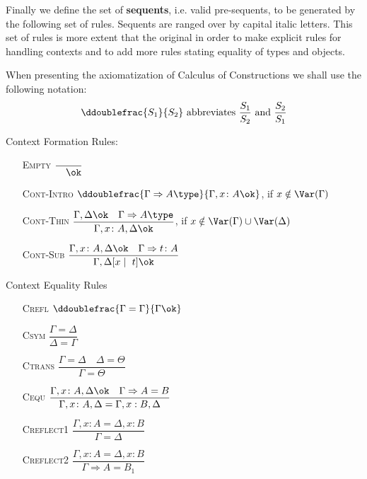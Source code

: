Finally we define the set of \textbf{sequents}, i.e. valid pre-sequents, 
to be generated by the following set of rules. 
Sequents are ranged over by capital italic letters.
This set of rules is more extent that the original in order to make explicit rules for 
handling contexts and to add more rules stating equality of types and objects.

When presenting the axiomatization of Calculus of Constructions we shall use the following notation:
\[
    \ddoublefrac{S_1}{S_2} \text{ abbreviates } \dfrac{S_1}{S_2} \text{ and } \dfrac{S_2}{S_1}
\]

Context Formation Rules:
\begin{enumerate} %
    \item[\textsc{Empty}] $\dfrac{}{\quad \ok}$
    \item[\textsc{Cont-Intro}] $\ddoublefrac{\Gamma \Rightarrow A \type}{\Gamma, x \colon A \ok}$, if $x \notin \Var(\Gamma)$
    \item[\textsc{Cont-Thin}] $\dfrac{
            \Gamma, \Delta \ok \quad \Gamma \Rightarrow A \type
        }{
            \Gamma, x \colon A, \Delta \ok
        }$, if $x \notin \Var(\Gamma) \cup \Var(\Delta)$
    \item[\textsc{Cont-Sub}] $\dfrac{
        \Gamma, x \colon A, \Delta \ok \quad \Gamma \Rightarrow t \colon A
    }{
        \Gamma, \Delta[x \mid\ t] \ok
    }$
\end{enumerate}

Context Equality Rules
\begin{enumerate}
    \item[\textsc{Crefl}] $\ddoublefrac{
        \Gamma = \Gamma
    }{
        \Gamma \ok
    }$
    \item[\textsc{Csym}] $\dfrac{
        \Gamma = \Delta
    }{
        \Delta = \Gamma
    }$
    \item[\textsc{Ctrans}] $\dfrac{
        \Gamma = \Delta \quad \Delta = \Theta
    }{
        \Gamma = \Theta
    }$
    \item[\textsc{Cequ}] $\dfrac{
        \Gamma, x \colon A, \Delta \ok 
        \quad 
        \Gamma \Rightarrow A = B
    }{
        \Gamma, x \colon A, \Delta
        =
        \Gamma, x : B, \Delta
    }$
    \item[\textsc{Creflect1}] $\dfrac{
        \Gamma, x \colon A 
        = 
        \Delta, x \colon B
    }{
        \Gamma = \Delta
    }$
    \item[\textsc{Creflect2}] $\dfrac{
        \Gamma, x \colon A 
        = \Delta, x \colon B
    }{
        \Gamma \Rightarrow A = B_1
    }$
\end{enumerate}

